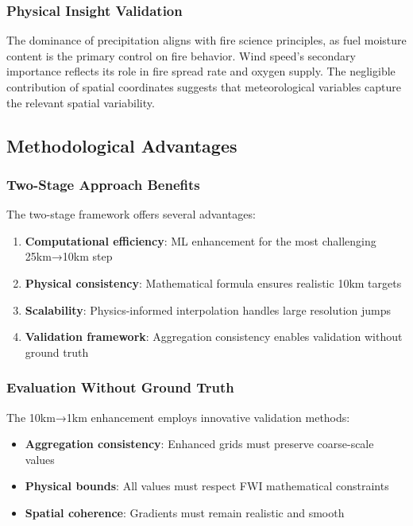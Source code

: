 \documentclass[11pt,a4paper]{article}
\begin{document}
\subsubsection{Physical Insight Validation}
The dominance of precipitation aligns with fire science principles, as fuel moisture content is the primary control on fire behavior. Wind speed's secondary importance reflects its role in fire spread rate and oxygen supply. The negligible contribution of spatial coordinates suggests that meteorological variables capture the relevant spatial variability.

\subsection{Methodological Advantages}

\subsubsection{Two-Stage Approach Benefits}
The two-stage framework offers several advantages:
\begin{enumerate}
    \item \textbf{Computational efficiency}: ML enhancement for the most challenging 25km→10km step
    \item \textbf{Physical consistency}: Mathematical formula ensures realistic 10km targets
    \item \textbf{Scalability}: Physics-informed interpolation handles large resolution jumps
    \item \textbf{Validation framework}: Aggregation consistency enables validation without ground truth
\end{enumerate}

\subsubsection{Evaluation Without Ground Truth}
The 10km→1km enhancement employs innovative validation methods:
\begin{itemize}
    \item \textbf{Aggregation consistency}: Enhanced grids must preserve coarse-scale values
    \item \textbf{Physical bounds}: All values must respect FWI mathematical constraints
    \item \textbf{Spatial coherence}: Gradients must remain realistic and smooth
\end{itemize}
\end{document}
